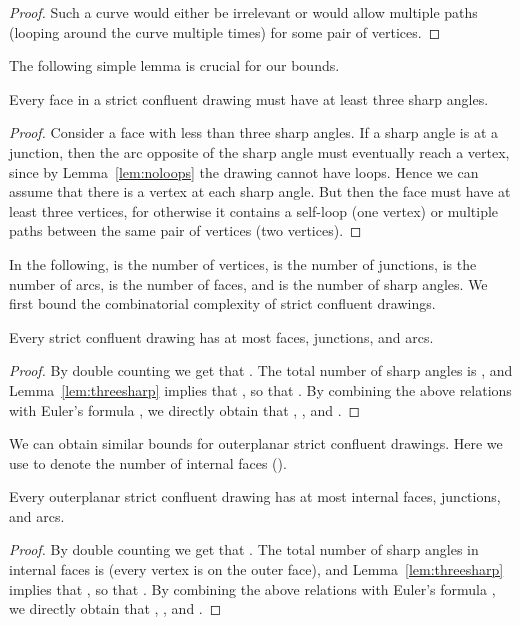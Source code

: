\documentclass{llncs}
\begin{document}
\begin {proof}
  Such a curve would either be irrelevant or would allow multiple paths (looping around the curve multiple times) for some pair of vertices.
\end {proof}

The following simple lemma is crucial for our bounds.
\begin{lemma}\label{lem:threesharp}
Every face in a strict confluent drawing must have at least three sharp angles.
\end{lemma}
\begin{proof}
Consider a face with less than three sharp angles. If a sharp angle is at a junction, then the arc opposite of the sharp angle must eventually reach a vertex, since by Lemma~\ref {lem:noloops} the drawing cannot have loops. Hence we can assume that there is a vertex at each sharp angle. But then the face must have at least three vertices, for otherwise it contains a self-loop (one vertex) or multiple paths between the same pair of vertices (two vertices).
\end{proof}
In the following,  is the number of vertices,  is the number of junctions,  is the number of arcs,  is the number of faces, and  is the number of sharp angles. We first bound the combinatorial complexity of strict confluent drawings.
\begin{lemma}\label{lem:boundplanar}
Every strict confluent drawing has at most  faces,  junctions, and  arcs.
\end{lemma}
\begin{proof}
By double counting we get that . The total number of sharp angles is , and Lemma~\ref{lem:threesharp} implies that , so that . By combining the above relations with Euler's formula , we directly obtain that , , and .
\end{proof}
We can obtain similar bounds for outerplanar strict confluent drawings. Here we use  to denote the number of internal faces ().
\begin{lemma}\label{lem:boundouterplanar}
Every outerplanar strict confluent drawing has at most  internal faces,  junctions, and  arcs.
\end{lemma}
\begin{proof}
By double counting we get that . The total number of sharp angles in internal faces is  (every vertex is on the outer face), and Lemma~\ref{lem:threesharp} implies that , so that . By combining the above relations with Euler's formula , we directly obtain that , , and .
\end{proof}
\end{document}
